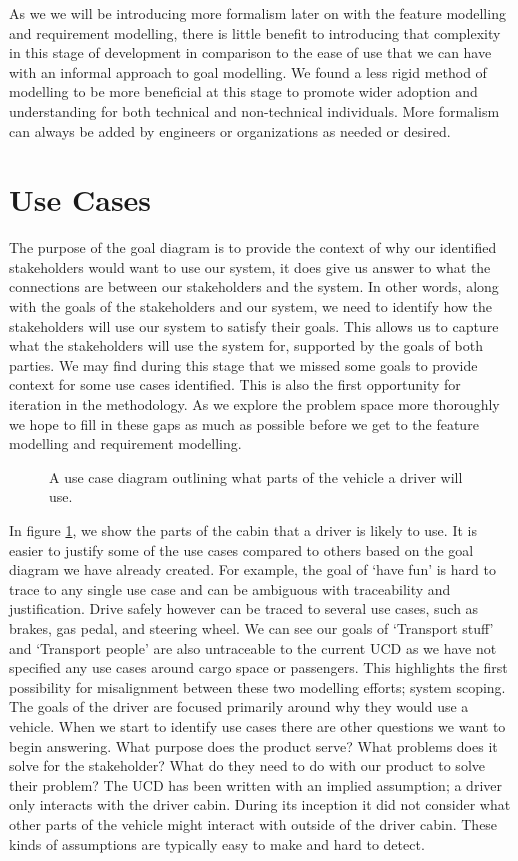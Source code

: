 As we we will be introducing more formalism later on with the feature modelling and requirement modelling, there is little benefit to introducing that complexity in this stage of development in comparison to the ease of use that we can have with an informal approach to goal modelling. We found a less rigid method of modelling to be more beneficial at this stage to promote wider adoption and understanding for both technical and non-technical individuals. More formalism can always be added by engineers or organizations as needed or desired.

\section{Use Cases}

The purpose of the goal diagram is to provide the context of why our identified stakeholders would want to use our system, it does give us answer to what the connections are between our stakeholders and the system. In other words, along with the goals of the stakeholders and our system, we need to identify how the stakeholders will use our system to satisfy their goals. This allows us to capture what the stakeholders will use the system for, supported by the goals of both parties. We may find during this stage that we missed some goals to provide context for some use cases identified. This is also the first opportunity for iteration in the methodology. As we explore the problem space more thoroughly we hope to fill in these gaps as much as possible before we get to the feature modelling and requirement modelling.

\begin{figure}
	\centering
	
	\caption{A use case diagram outlining what parts of the vehicle a driver will use.}
	\label{fig:Driver_UCD}
\end{figure} 

In figure \ref{fig:Driver_UCD}, we show the parts of the cabin that a driver is likely to use. It is easier to justify some of the use cases compared to others based on the goal diagram we have already created. For example, the goal of `have fun' is hard to trace to any single use case and can be ambiguous with traceability and justification. Drive safely however can be traced to several use cases, such as brakes, gas pedal, and steering wheel. We can see our goals of `Transport stuff' and `Transport people' are also untraceable to the current \ac{UCD} as we have not specified any use cases around cargo space or passengers. This highlights the first possibility for misalignment between these two modelling efforts; system scoping. The goals of the driver are focused primarily around why they would use a vehicle. When we start to identify use cases there are other questions we want to begin answering. What purpose does the product serve? What problems does it solve for the stakeholder? What do they need to do with our product to solve their problem? The \ac{UCD} has been written with an implied assumption; a driver only interacts with the driver cabin. During its inception it did not consider what other parts of the vehicle might interact with outside of the driver cabin. These kinds of assumptions are typically easy to make and hard to detect. 

